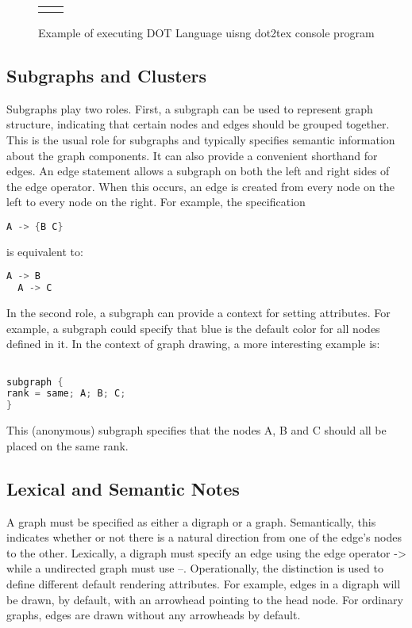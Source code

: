 \begin{figure}[H]
  \centering
\begin{tabular}{p{}p{}}
\subfloat[]{}&

\subfloat[]{}
\end{tabular}
  
  \caption{Example of executing DOT Language uisng dot2tex console program}
  \label{fig:dot}
\end{figure}

\subsection{Subgraphs and Clusters}
Subgraphs play two roles. First, a subgraph 
can be used to represent graph structure, 
indicating that certain nodes and edges should 
be grouped together. This is the usual role for 
subgraphs and typically specifies semantic 
information about the graph components. It 
can also provide a convenient shorthand for 
edges. An edge statement allows a subgraph on 
both the left and right sides of the edge operator. 
When this occurs, an edge is created from every 
node on the left to every node on the right. 
For example, the specification
\begin{lstlisting}[language=C, style=mystyle]
  A -> {B C}
\end{lstlisting}
is equivalent to:
\begin{lstlisting}[language=C, style=mystyle]
  A -> B 
  A -> C
\end{lstlisting}
In the second role, a subgraph can provide a 
context for setting attributes. For example, a 
subgraph could specify that blue is the default 
color for all nodes defined in it. In the context 
of graph drawing, a more interesting example is:
\begin{lstlisting}[language=Java, style=mystyle]

subgraph { 
rank = same; A; B; C; 
} 
\end{lstlisting}
This (anonymous) subgraph specifies that the nodes 
A, B and C should all be placed on the same rank.

\subsection{Lexical and Semantic Notes}
A graph must be specified as either a digraph or a 
graph. Semantically, this indicates whether or not 
there is a natural direction from one of the edge's 
nodes to the other. Lexically, a digraph must specify 
an edge using the edge operator -> while a undirected 
graph must use --. Operationally, the distinction 
is used to define different default rendering 
attributes. For example, edges in a digraph will 
be drawn, by default, with an arrowhead pointing 
to the head node. For ordinary graphs, edges are 
drawn without any arrowheads by default.

